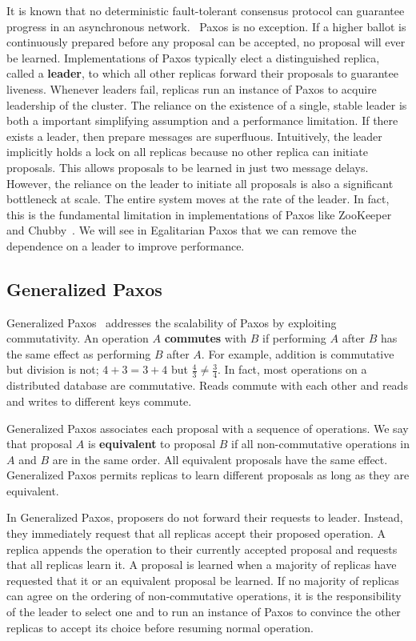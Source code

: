 \documentclass{article}
\begin{document}
    It is known that no deterministic fault-tolerant consensus protocol can guarantee progress in an
    asynchronous network.~\cite{consensus} Paxos is no exception. If a higher ballot is continuously
    prepared before any proposal can be accepted, no proposal will ever be learned. Implementations of
    Paxos typically elect a distinguished replica, called a \textbf{leader}, to which all other
    replicas forward their proposals to guarantee liveness. Whenever leaders fail, replicas run an
    instance of Paxos to acquire leadership of the cluster. The reliance on the existence of a single,
    stable leader is both a important simplifying assumption and a performance limitation. If there
    exists a leader, then prepare messages are superfluous. Intuitively, the leader implicitly holds
    a lock on all replicas because no other replica can initiate proposals. This allows proposals to
    be learned in just two message delays. However, the reliance on the leader to initiate all
    proposals is also a significant bottleneck at scale. The entire system moves at the rate of the
    leader. In fact, this is the fundamental limitation in implementations of Paxos like ZooKeeper
    ~\cite{zookeeper} and Chubby~\cite{chubby}. We will see in Egalitarian Paxos that we can remove
    the dependence on a leader to improve performance.

    \subsection{Generalized Paxos}
    Generalized Paxos~\cite{generalized-paxos} addresses the scalability of Paxos by exploiting
    commutativity. An operation $A$ \textbf{commutes} with $B$ if performing $A$ after $B$ has the
    same effect as performing $B$ after $A$. For example, addition is commutative but division is not;
    $4 + 3 = 3 + 4$ but $\frac{4}{3} \ne \frac{3}{4}$. In fact, most operations on a distributed
    database are commutative. Reads commute with each other and reads and writes to different keys
    commute.

    Generalized Paxos associates each proposal with a sequence of operations. We say that proposal $A$
    is \textbf{equivalent} to proposal $B$ if all non-commutative operations in $A$ and $B$ are in the
    same order. All equivalent proposals have the same effect. Generalized Paxos permits replicas to
    learn different proposals as long as they are equivalent.

    In Generalized Paxos, proposers do not forward their requests to leader. Instead, they immediately
    request that all replicas accept their proposed operation. A replica appends the operation to
    their currently accepted proposal and requests that all replicas learn it. A proposal is learned
    when a majority of replicas have requested that it or an equivalent proposal be learned.
    If no majority of replicas can agree on the ordering of non-commutative operations, it is the
    responsibility of the leader to select one and to run an instance of Paxos to convince the other
    replicas to accept its choice before resuming normal operation.
\end{document}
